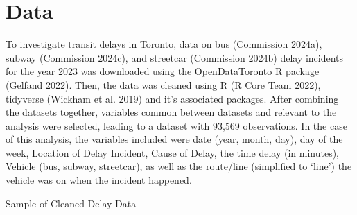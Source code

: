 \documentclass[
  letterpaper,
  DIV=11,
  numbers=noendperiod]{scrartcl}
\begin{document}
\section{Data}\label{sec-data}

To investigate transit delays in Toronto, data on bus (Commission
2024a), subway (Commission 2024c), and streetcar (Commission 2024b)
delay incidents for the year 2023 was downloaded using the
OpenDataToronto R package (Gelfand 2022). Then, the data was cleaned
using R (R Core Team 2022), tidyverse (Wickham et al. 2019) and it's
associated packages. After combining the datasets together, variables
common between datasets and relevant to the analysis were selected,
leading to a dataset with 93,569 observations. In the case of this
analysis, the variables included were date (year, month, day), day of
the week, Location of Delay Incident, Cause of Delay, the time delay (in
minutes), Vehicle (bus, subway, streetcar), as well as the route/line
(simplified to `line') the vehicle was on when the incident happened.

\begin{table}

\caption{\label{tbl-cleaned\_data}Sample of Cleaned Delay Data}

\centering{

}

\end{table}%

\begin{table}
\caption{Sample of Cleaned Delay Data}\tabularnewline

\centering
{}
\end{table}
\end{document}
